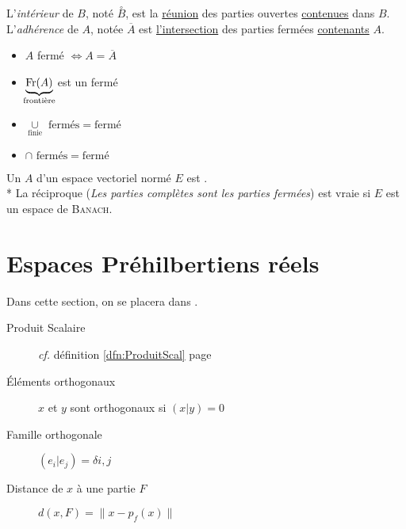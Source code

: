 \documentclass[11pt,a4paper,fleqn,pdftex]{report}
\begin{document}
\begin{dfn}
L'\emph{intérieur} de $B$, noté $\overset{\circ}{B}$, est la \uline{réunion} des parties ouvertes \uline{contenues} dans $B$. \newline
L'\emph{adhérence} de $A$, notée $\overline{A}$ est \uline{l'intersection} des parties fermées \uline{contenants} $A$.
\end{dfn}

\begin{prop}
\begin{itemize}
\item $A$ fermé $\Leftrightarrow A=\overline{A}$
\item $\underbrace{\mathrm{Fr}(A)}_{\mathclap{\text{frontière}}}$ est un fermé
\item $\underset{\text{finie}}{\cup} \text{ fermés} = \text{fermé}$
\item $\cap \text{ fermés} = \text{fermé}$
\end{itemize}
\end{prop}

\begin{itheorem}
    Un  $A$ d'un espace vectoriel normé $E$ est .\\*
    La réciproque (\textit{Les parties complètes sont les parties fermées}) est vraie si $E$ est un espace de \textsc{Banach}.
\end{itheorem}
\chapter{Espaces Préhilbertiens réels}
Dans cette section, on se placera dans \Reel{}.
\begin{methode}
\begin{description}
\item[Produit Scalaire] \textit{cf.} définition \ref{dfn:ProduitScal} page \pageref{dfn:ProduitScal}
\item[Éléments orthogonaux] $x$ et $y$ sont orthogonaux si $( x | y ) = 0 $
\item[Famille orthogonale] $(e_i|e_j) = \delta{i,j}$
\item[Distance de $x$ à une partie $F$] $d(x,F) = \| x - p_f(x) \|$
\end{description}
\end{methode}
\end{document}
